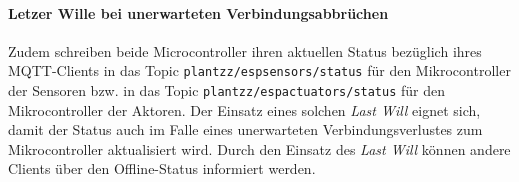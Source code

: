 \paragraph{Letzer Wille bei unerwarteten Verbindungsabbrüchen}

Zudem schreiben beide Microcontroller ihren aktuellen Status bezüglich ihres MQTT-Clients in das Topic \texttt{plantzz/espsensors/status} für den Mikrocontroller der Sensoren bzw. in das Topic \texttt{plantzz/espactuators/status} für den Mikrocontroller der Aktoren. Der Einsatz eines solchen \textit{Last Will} eignet sich, damit der Status auch im Falle eines unerwarteten Verbindungsverlustes zum Mikrocontroller aktualisiert wird. Durch den Einsatz des \textit{Last Will} können andere Clients über den Offline-Status informiert werden.